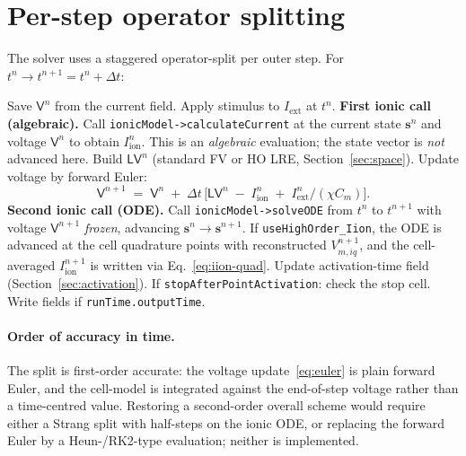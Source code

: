 \documentclass[11pt,a4paper]{article}
\newcommand{\Vmsub}[1]{V_{m,#1}}
\newcommand{\Iion}{I_{\text{ion}}}
\newcommand{\Iext}{I_{\text{ext}}}
\newcommand{\Lop}{\mathsf{L}}
\newcommand{\code}[1]{\texttt{\small #1}}
\begin{document}
\section{Per-step operator splitting}
\label{sec:split}

The solver uses a staggered operator-split per outer step. For
$t^{n}\rightarrow t^{n+1}=t^{n}+\Delta t$:

\begin{algorithm}[H]
\caption{Per-step flow of \texttt{highOrderElectroActivationFoamExplicit}.}
\begin{algorithmic}[1]
\State Save $\mathsf{V}^{n}$ from the current field.
\State Apply stimulus to $\Iext$ at $t^{n}$.
\State \textbf{First ionic call (algebraic).} Call
       \code{ionicModel->calculateCurrent} at the current state
       $\mathbf{s}^{n}$ and voltage $\mathsf{V}^{n}$ to obtain
       $\Iion^{n}$. This is an \emph{algebraic} evaluation; the
       state vector is \emph{not} advanced here.
\State Build $\Lop\mathsf{V}^{n}$ (standard FV or HO LRE,
       Section~\ref{sec:space}).
\State Update voltage by forward Euler:
       \begin{equation*}
         \mathsf{V}^{n+1}
          \;=\;
          \mathsf{V}^{n}
          \;+\;
          \Delta t\,\bigl[
            \Lop\mathsf{V}^{n}
            \;-\;\Iion^{n}
            \;+\;\Iext^{n}/(\chi C_{m})
          \bigr].
       \end{equation*}
\State \textbf{Second ionic call (ODE).} Call
       \code{ionicModel->solveODE} from $t^{n}$ to $t^{n+1}$ with
       voltage $\mathsf{V}^{n+1}$ \emph{frozen}, advancing
       $\mathbf{s}^{n}\to\mathbf{s}^{n+1}$. If
       \code{useHighOrder\_Iion}, the ODE is advanced at the cell
       quadrature points with reconstructed $\Vmsub{iq}^{n+1}$, and
       the cell-averaged $\Iion^{n+1}$ is written via
       Eq.~\eqref{eq:iion-quad}.
\State Update activation-time field
       (Section~\ref{sec:activation}).
\State If \code{stopAfterPointActivation}: check the stop cell.
\State Write fields if \code{runTime.outputTime}.
\end{algorithmic}
\end{algorithm}

\paragraph{Order of accuracy in time.}
The split is first-order accurate: the voltage update~\eqref{eq:euler}
is plain forward Euler, and the cell-model is integrated against the
end-of-step voltage rather than a time-centred value. Restoring a
second-order overall scheme would require either a Strang split with
half-steps on the ionic ODE, or replacing the forward Euler by a
Heun-/RK2-type evaluation; neither is implemented.
\end{document}
